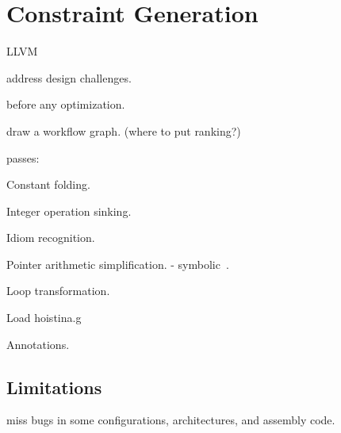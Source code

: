 \section{Constraint Generation}
\label{s:gen}

LLVM~\cite{lattner:llvm}

address design challenges.

before any optimization.

draw a workflow graph. (where to put ranking?)

passes:

Constant folding.

Integer operation sinking.

Idiom recognition.

Pointer arithmetic simplification.
- symbolic~\cite{engelen:symbolic}.

Loop transformation.

Load hoistina.g

Annotations.

\subsection{Limitations}

miss bugs in some configurations, architectures,
and assembly code.
